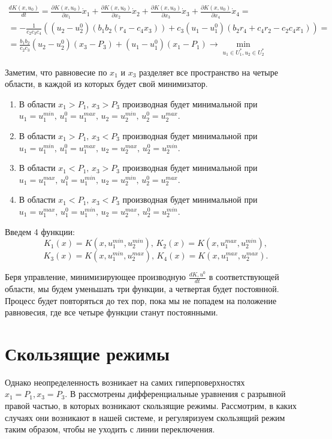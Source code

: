 \documentclass[11pt]{article}
\theoremstyle{definition}
\newcommand\dd[2]{\frac{\partial#1}{\partial#2}}
\begin{document}
\begin{multline*}
    \frac{dK(x,u_0)}{dt} = \dd{K(x,u_0)}{x_1}\dot x_1 + \dd{K(x,u_0)}{x_2}\dot x_2 + \dd{K(x,u_0)}{x_3}\dot x_3 + \dd{K(x,u_0)}{x_4}\dot x_4 = \\
    = -\frac{1}{c_2c_3c_4}\left((u_2 - u_2^0)(b_1b_2(r_4 - c_4x_3)) + c_3(u_1 - u_1^0)(b_2r_4 + c_4r_2 - c_2c_4x_1)\right) = \\
    = \frac{b_1b_2}{c_2c_3}(u_2 - u_2^0)(x_3 - P_3) + (u_1 - u_1^0)(x_1 - P_1) \to \min\limits_{u_1 \in U_1^*, u_2 \in U_2^*}
\end{multline*}

Заметим, что равновесие по $x_1$ и $x_3$ разделяет все пространство на четыре области, в каждой из которых будет свой минимизатор.
\begin{enumerate}
\item
	В области $x_1 > P_1, \, x_3 > P_3$ производная будет минимальной при $u_1 = u_1^{min}, \, u_1^0 = u_1^{max}, \, u_2 = u_2^{min}, \, u_2^0 = u_2^{max}.$
\item
	В области $x_1 > P_1, \, x_3 < P_3$ производная будет минимальной при $u_1 = u_1^{min}, \, u_1^0 = u_1^{max}, \, u_2 = u_2^{max}, \, u_2^0 = u_2^{min}.$
\item
	В области $x_1 < P_1, \, x_3 > P_3$ производная будет минимальной при $u_1 = u_1^{max}, \, u_1^0 = u_1^{min}, \, u_2 = u_2^{min}, \, u_2^0 = u_2^{max}.$
\item
	В области $x_1 < P_1, \, x_3 < P_3$ производная будет минимальной при $u_1 = u_1^{max}, \, u_1^0 = u_1^{min}, \, u_2 = u_2^{max}, \, u_2^0 = u_2^{min}.$
\end{enumerate}

Введем 4 функции:
$$K_1(x) = K(x,u_1^{min}, u_2^{min}), \, K_2(x) = K(x,u_1^{max}, u_2^{min}),$$ 
$$K_3(x) = K(x,u_1^{min}, u_2^{max}), \, K_4(x) = K(x,u_1^{max}, u_2^{max}).$$

Беря управление, минимизирующее производную $\frac{dK, u^0}{dt}$ в соответствующей области, мы будем уменьшать три функции, а четвертая будет постоянной. Процесс будет повторяться до тех пор, пока мы не попадем на положение равновесия, где все четыре функции станут постоянными. 

\section{Скользящие режимы} 
	\indent Однако неопределенность возникает на самих гиперповерхностях $x_1 = P_1, x_3 = P_3.$ В \cite{Filippov} рассмотрены дифференциальные уравнения с разрывной правой частью, в которых возникают скользящие режимы. Рассмотрим, в каких случаях они возникают в нашей системе, и регуляризуем скользящий режим таким образом, чтобы не уходить с линии переключения.
\end{document}
